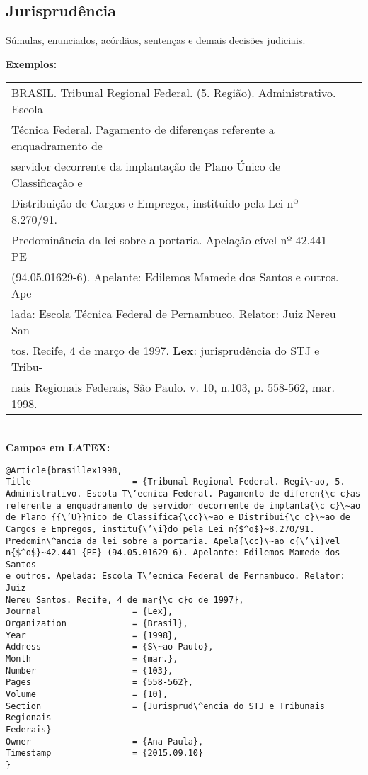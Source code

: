 \subsection{Jurisprudência}

Súmulas, enunciados, acórdãos, sentenças e demais decisões judiciais. 

\textbf{Exemplos:} \\

\begin{tabular}{|l|c|} \hline
BRASIL. Tribunal Regional Federal. (5. Região). Administrativo. Escola\\
Técnica Federal. Pagamento de diferenças referente a enquadramento de \\
servidor decorrente da implantação de Plano Único de Classificação e \\
Distribuição de Cargos e Empregos, instituído pela Lei nº 8.270/91. \\
Predominância da lei sobre a portaria. Apelação cível nº 42.441-PE \\
(94.05.01629-6). Apelante: Edilemos Mamede dos Santos e outros. Ape-\\
lada: Escola Técnica Federal de Pernambuco. Relator: Juiz Nereu San-\\
tos. Recife, 4 de março de 1997. \textbf{Lex}: jurisprudência do STJ e Tribu-\\
nais Regionais Federais, São Paulo. v. 10, n.103, p. 558-562, mar. 1998. \\\hline
\end{tabular} \\

\textbf{Campos em LATEX:} 

\begin{verbatim}
@Article{brasillex1998,
Title                    = {Tribunal Regional Federal. Regi\~ao, 5. 
Administrativo. Escola T\’ecnica Federal. Pagamento de diferen{\c c}as 
referente a enquadramento de servidor decorrente de implanta{\c c}\~ao 
de Plano {{\’U}}nico de Classifica{\cc}\~ao e Distribui{\c c}\~ao de 
Cargos e Empregos, institu{\’\i}do pela Lei n{$^o$}~8.270/91. 
Predomin\^ancia da lei sobre a portaria. Apela{\cc}\~ao c{\’\i}vel
n{$^o$}~42.441-{PE} (94.05.01629-6). Apelante: Edilemos Mamede dos Santos
e outros. Apelada: Escola T\’ecnica Federal de Pernambuco. Relator: Juiz
Nereu Santos. Recife, 4 de mar{\c c}o de 1997},
Journal                  = {Lex},
Organization             = {Brasil},
Year                     = {1998},
Address                  = {S\~ao Paulo},
Month                    = {mar.},
Number                   = {103},
Pages                    = {558-562},
Volume                   = {10},
Section                  = {Jurisprud\^encia do STJ e Tribunais Regionais 
Federais}
Owner                    = {Ana Paula},
Timestamp                = {2015.09.10}
}
\end{verbatim}
